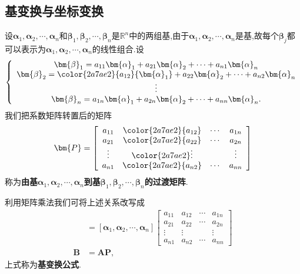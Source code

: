 \documentclass[9pt,a4paper]{book}
\begin{document}
\subsection{基变换与坐标变换}
\begin{defination}[过渡矩阵与基变换公式]
	设$\bm{\alpha}_1,\bm{\alpha}_2,\cdots,\bm{\alpha}_n $和$\bm{\beta}_1,\bm{\beta}_2,\cdots,\bm{\beta}_n $是$ \mathbb{R}^n $中的两组基,由于$\bm{\alpha}_1,\bm{\alpha}_2,\cdots,\bm{\alpha}_n $是基,故每个$ \bm{\beta}_j $都可以表示为$\bm{\alpha}_1,\bm{\alpha}_2,\cdots,\bm{\alpha}_n $的线性组合.设
\[\left\lbrace  	\begin{array}{c}
{\bm{\beta} _1} = {a_{11}}{\bm{\alpha} _1} + {a_{21}}{\bm{\alpha} _2} +  \cdots  + {a_{n1}}{\bm{\alpha}_n}\\
{\bm{\beta} _2} = \color{2a7ae2}{a_{12}}{\bm{\alpha}_1} + a_{22}{\bm{\alpha} _2} +  \cdots  + a_{n2}{\bm{\alpha}_n}\\
	\vdots\\
	{\bm{\beta} _n} = {a_{1n}}{\bm{\alpha} _1} + {a_{2n}}{\bm{\alpha} _2} +  \cdots  + {a_{nn}}{\bm{\alpha}_n}.
	\end{array} \right. \]
	我们把系数矩阵转置后的矩阵\[\bm{P}=\left[ {\begin{array}{*{20}{c}}
		{{a_{11}}}&{\color{2a7ae2}{a_{12}}}& \cdots &{{a_{1n}}}\\
		{{a_{21}}}&{\color{2a7ae2}{a_{22}}}& \cdots &{{a_{2n}}}\\
		\vdots &{ \color{2a7ae2}\vdots} &{}& \vdots \\
		{{a_{n1}}}&{\color{2a7ae2}{a_{n2}}}& \cdots &{{a_{nn}}}
		\end{array}} \right]\]称为\textbf{由基$\bm{\alpha}_1,\bm{\alpha}_2,\cdots,\bm{\alpha}_n $到基$\bm{\beta}_1,\bm{\beta}_2,\cdots,\bm{\beta}_n $的过渡矩阵}.
	
	利用矩阵乘法我们可将上述关系改写成\begin{align*}
 [\bm{\beta}_1,\bm{\beta}_2,\cdots,\bm{\beta}_n]&=[\bm{\alpha}_1,\bm{\alpha}_2,\cdots,\bm{\alpha}_n ]\left[ {\begin{array}{*{20}{c}}
		{{a_{11}}}&{{a_{12}}}& \cdots &{{a_{1n}}}\\
		{{a_{21}}}&{{a_{22}}}& \cdots &{{a_{2n}}}\\
		\vdots &{ \vdots} &{}& \vdots \\
		{{a_{n1}}}&{{a_{n2}}}& \cdots &{{a_{nn}}}
		\end{array}} \right]\\\bm{B}&=\bm{AP} ,	\end{align*}
	上式称为\textbf{基变换公式}.
\end{defination}
\end{document}
